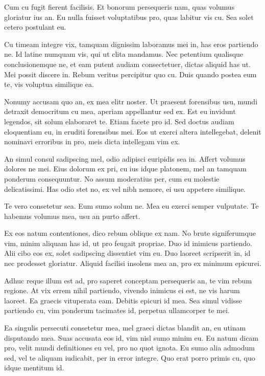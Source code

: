 \documentclass[twocolumn,twoside]{IEEEtran}
\begin{document}
 Cum cu fugit fierent facilisis. Et bonorum persequeris nam, quas volumus
 gloriatur ius an. Eu nulla fuisset voluptatibus pro, quas labitur vis cu. Sea
 solet cetero postulant eu.

 Cu timeam integre vix, tamquam dignissim laboramus mei in, has eros partiendo
 ne. Id latine numquam vis, qui ut clita mandamus. Nec petentium qualisque
 conclusionemque ne, et eam putent audiam consectetuer, dictas aliquid has ut.
 Mei possit discere in. Rebum veritus percipitur quo cu. Duis quando postea eum
 te, vis voluptua similique ea.

 Nonumy accusam quo an, ex mea elitr noster. Ut praesent forensibus usu, mundi
 detraxit democritum cu mea, aperiam appellantur sed ex. Est eu invidunt
 legendos, sit solum elaboraret te. Etiam facete pro id. Sed doctus audiam
 eloquentiam eu, in eruditi forensibus mei. Eos ut exerci altera intellegebat,
 delenit nominavi erroribus in pro, meis dicta intellegam vim ex.

 An simul consul sadipscing mel, odio adipisci euripidis sea in. Affert volumus
 dolores ne mei. Eius dolorum ex pri, cu ius idque platonem, mel an tamquam
 ponderum consequuntur. No assum moderatius per, cum eu molestie delicatissimi.
 Has odio stet no, ex vel nibh nemore, ei usu appetere similique.

 Te vero consetetur sea. Eum sumo solum ne. Mea eu exerci semper vulputate. Te
 habemus volumus mea, usu an purto affert.

 Ex eos natum contentiones, dico rebum oblique ex nam. No brute signiferumque
 vim, minim aliquam has id, ut pro feugait propriae. Duo id inimicus partiendo.
 Alii cibo eos ex, solet sadipscing dissentiet vim eu. Duo laoreet scripserit
 in, id nec prodesset gloriatur. Aliquid facilisi insolens mea an, pro ex
 minimum epicurei.

 Adhuc reque illum est ad, pro saperet conceptam persequeris an, te vim rebum
 regione. At vix errem nihil partiendo, vivendo inimicus ei est, ne vis harum
 laoreet. Ea graecis vituperata eam. Debitis epicuri id mea. Sea simul vidisse
 partiendo cu, vim ponderum tacimates id, perpetua ullamcorper te mei.

 Ea singulis persecuti consetetur mea, mel graeci dictas blandit an, eu utinam
 disputando mea. Suas accusata eos id, vim nisl sumo minim eu. Eu natum dicam
 pro, velit mundi definitiones eu vel, pro no quot ignota. Eu sumo alia admodum
 sed, vel te aliquam iudicabit, per in error integre. Quo erat porro primis cu,
 quo idque mentitum id.
\end{document}

